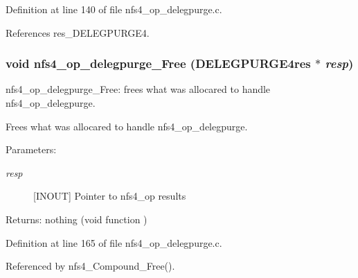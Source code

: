 Definition at line 140 of file nfs4\_\-op\_\-delegpurge.c.

References res\_\-DELEGPURGE4.
\subsubsection{\setlength{\rightskip}{0pt plus 5cm}void nfs4\_\-op\_\-delegpurge\_\-Free (DELEGPURGE4res $\ast$ {\em resp})}\label{nfs4__op__delegpurge_8c_a3}


nfs4\_\-op\_\-delegpurge\_\-Free: frees what was allocared to handle nfs4\_\-op\_\-delegpurge.

Frees what was allocared to handle nfs4\_\-op\_\-delegpurge.

\begin{Desc}
\item[Parameters:]
\begin{description}
\item[{\em resp}][INOUT] Pointer to nfs4\_\-op results\end{description}
\end{Desc}
\begin{Desc}
\item[Returns:]nothing (void function ) \end{Desc}


Definition at line 165 of file nfs4\_\-op\_\-delegpurge.c.

Referenced by nfs4\_\-Compound\_\-Free().